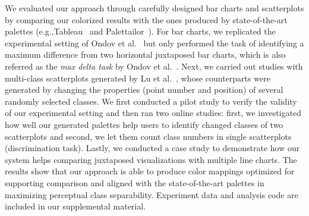 
We evaluated our approach through carefully designed bar charts and scatterplots by comparing our colorized results with the ones produced by state-of-the-art palettes (e.g.,Tableau~\cite{tableau} and Palettailor~\cite{Lu21}). For bar charts, we replicated the experimental setting of Ondov et al.~\cite{Ondov19} but only performed the task of identifying a maximum difference from two horizontal juxtaposed bar charts, which is also referred as the \emph{max delta task} by Ondov et al.~\cite{Ondov19}.
Next, we carried out studies with multi-class scatterplots generated by Lu et al.~\cite{Lu21}, whose counterparts were generated by changing the properties (point number and position) of several randomly selected classes.
We first conducted a pilot study to verify the validity of our experimental setting and then ran two online studies: first, we investigated how well our generated palettes help users to identify changed classes of two scatterplots and second, we let them count class numbers in single scatterplots (discrimination task).
Lastly, we conducted a case study to demonstrate how our system helps comparing juxtaposed visualizations with multiple line charts.
The results show that our approach is able to produce color mappings optimized for supporting comparison and aligned with the state-of-the-art palettes in maximizing perceptual class separability. Experiment data and analysis code are included in our supplemental material.

